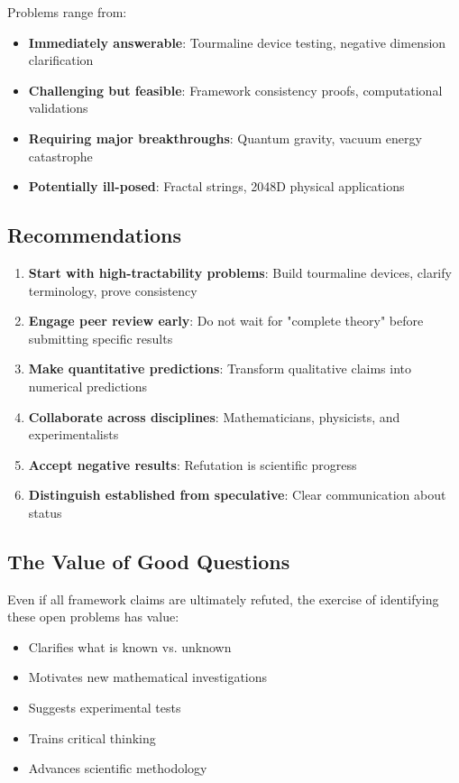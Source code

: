 Problems range from:
\begin{itemize}
    \item \textbf{Immediately answerable}: Tourmaline device testing, negative dimension clarification
    \item \textbf{Challenging but feasible}: Framework consistency proofs, computational validations
    \item \textbf{Requiring major breakthroughs}: Quantum gravity, vacuum energy catastrophe
    \item \textbf{Potentially ill-posed}: Fractal strings, 2048D physical applications
\end{itemize}

\subsection{Recommendations}

\begin{enumerate}
    \item \textbf{Start with high-tractability problems}: Build tourmaline devices, clarify terminology, prove consistency

    \item \textbf{Engage peer review early}: Do not wait for "complete theory" before submitting specific results

    \item \textbf{Make quantitative predictions}: Transform qualitative claims into numerical predictions

    \item \textbf{Collaborate across disciplines}: Mathematicians, physicists, and experimentalists

    \item \textbf{Accept negative results}: Refutation is scientific progress

    \item \textbf{Distinguish established from speculative}: Clear communication about status
\end{enumerate}

\subsection{The Value of Good Questions}

Even if all framework claims are ultimately refuted, the exercise of identifying these open problems has value:

\begin{itemize}
    \item Clarifies what is known vs. unknown
    \item Motivates new mathematical investigations
    \item Suggests experimental tests
    \item Trains critical thinking
    \item Advances scientific methodology
\end{itemize}

